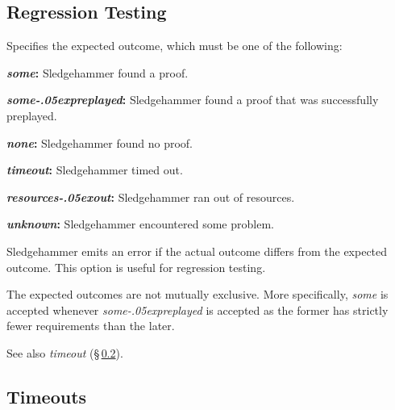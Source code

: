 \documentclass[a4paper,12pt]{article}
\let\oldS=\S
\def\S{\oldS\,}
\renewcommand\_{\hbox{\textunderscore\kern-.05ex}}
\begin{document}
\subsection{Regression Testing}
\label{regression-testing}

\begin{enum}
Specifies the expected outcome, which must be one of the following:

\begin{enum}
\item[\labelitemi] \textbf{\textit{some}:} Sledgehammer found a proof.
\item[\labelitemi] \textbf{\textit{some\_preplayed}:} Sledgehammer found a proof that was successfully preplayed.
\item[\labelitemi] \textbf{\textit{none}:} Sledgehammer found no proof.
\item[\labelitemi] \textbf{\textit{timeout}:} Sledgehammer timed out.
\item[\labelitemi] \textbf{\textit{resources\_out}:} Sledgehammer ran out of resources.
\item[\labelitemi] \textbf{\textit{unknown}:} Sledgehammer encountered some
problem.
\end{enum}

Sledgehammer emits an error if the actual outcome differs from the expected
outcome. This option is useful for regression testing.

The expected outcomes are not mutually exclusive. More specifically,
\textit{some} is accepted whenever \textit{some\_preplayed} is accepted as the
former has strictly fewer requirements than the later.

\nopagebreak
{\small See also \textit{timeout} (\S\ref{timeouts}).}
\end{enum}


\subsection{Timeouts}
\label{timeouts}
\end{document}
